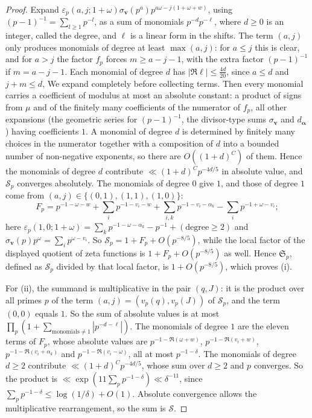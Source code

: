 \documentclass[11pt,colorlinks]{charlie}
\begin{document}
\begin{proof}
Expand $\varepsilon_p(a,j;1+\omega)\sigma_{\boldsymbol v}(p^a)p^{a\omega-j(1+\omega+w)}$, using $(p-1)^{-1}=\sum_{l\ge1}p^{-l}$, as a sum of monomials $p^{-d}p^{-\ell}$, where $d\ge0$ is an integer, called the degree, and $\ell$ is a linear form in the shifts. The term $(a,j)$ only produces monomials of degree at least $\max(a,j)$: for $a\le j$ this is clear, and for $a>j$ the factor $f_p$ forces $m\ge a-j-1$, with the extra factor $(p-1)^{-1}$ if $m=a-j-1$. Each monomial of degree $d$ has $|\Re\ell|\le\frac{4d}{20}$, since $a\le d$ and $j+m\le d$, We expand completely before collecting terms. Then every monomial carries a coefficient of modulus at most an absolute constant: a product of signs from $\mu$ and of the finitely many coefficients of the numerator of $f_p$, all other expansions (the geometric series for $(p-1)^{-1}$, the divisor-type sums $\sigma_{\boldsymbol v}$ and $d_{\boldsymbol\alpha}$) having coefficients $1$. A monomial of degree $d$ is determined by finitely many choices in the numerator together with a composition of $d$ into a bounded number of non-negative exponents, so there are $O((1+d)^{C})$ of them. Hence the monomials of degree $d$ contribute $\ll(1+d)^Cp^{-4d/5}$ in absolute value, and $\mathcal S_p$ converges absolutely. The monomials of degree $0$ give $1$, and those of degree $1$ come from $(a,j)\in\{(0,1),(1,1),(1,0)\}$:
\[
 F_p=p^{-1-\omega-w}+\sum_ip^{-1-v_i-w}+\sum_{i,k}p^{-1-v_i-\alpha_k}-\sum_ip^{-1+\omega-v_i};
\]
here $\varepsilon_p(1,0;1+\omega)=\sum_kp^{-1-\omega-\alpha_k}-p^{-1}+(\text{degree}\ge2)$ and $\sigma_{\boldsymbol v}(p)p^\omega=\sum_ip^{\omega-v_i}$. So $\mathcal S_p=1+F_p+O(p^{-8/5})$, while the local factor of the displayed quotient of zeta functions is $1+F_p+O(p^{-8/5})$ as well. Hence $\mathfrak S_p$, defined as $\mathcal S_p$ divided by that local factor, is $1+O(p^{-8/5})$, which proves (i).

For (ii), the summand is multiplicative in the pair $(q,J)$: it is the product over all primes $p$ of the term $(a,j)=(v_p(q),v_p(J))$ of $\mathcal S_p$, and the term $(0,0)$ equals $1$. So the sum of absolute values is at most $\prod_p(1+\sum_{\text{monomials}\ne1}|p^{-d-\ell}|)$. The monomials of degree $1$ are the eleven terms of $F_p$, whose absolute values are $p^{-1-\Re(\omega+w)}$, $p^{-1-\Re(v_i+w)}$, $p^{-1-\Re(v_i+\alpha_k)}$ and $p^{-1-\Re(v_i-\omega)}$, all at most $p^{-1-\delta}$. The monomials of degree $d\ge2$ contribute $\ll(1+d)^Cp^{-4d/5}$, whose sum over $d\ge2$ and $p$ converges. So the product is $\ll\exp(11\sum_pp^{-1-\delta})\ll\delta^{-11}$, since $\sum_pp^{-1-\delta}\le\log(1/\delta)+O(1)$. Absolute convergence allows the multiplicative rearrangement, so the sum is $\mathcal S$.


\end{proof}
\end{document}
